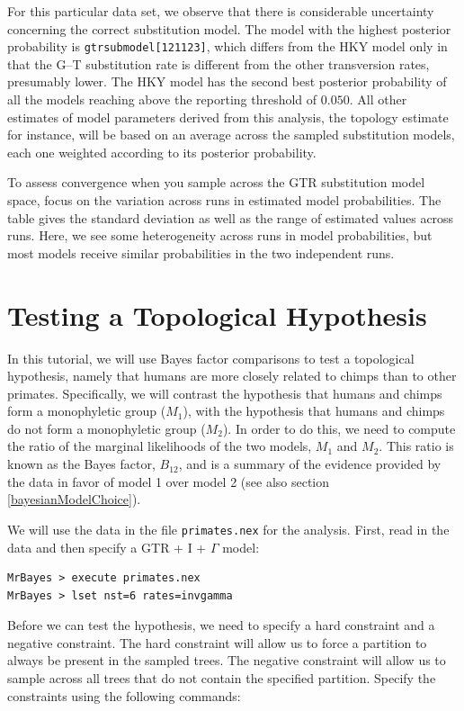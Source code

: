 \documentclass[12pt]{book}
\begin{document}
For this particular data set, we observe that there is considerable uncertainty concerning the
correct substitution model. The model with the highest posterior probability is
\texttt{gtrsubmodel[121123]}, which differs from the HKY model only in that the G--T substitution
rate is different from the other transversion rates, presumably lower. The HKY model has the second
best posterior probability of all the models reaching above the reporting threshold of $0.050$. All
other estimates of model parameters derived from this analysis, the topology estimate for instance,
will be based on an average across the sampled substitution models, each one weighted according to
its posterior probability.

To assess convergence when you sample across the GTR substitution model space, focus on the
variation across runs in estimated model probabilities. The table gives the standard deviation as
well as the range of estimated values across runs. Here, we see some heterogeneity across runs in
model probabilities, but most models receive similar probabilities in the two independent runs.

\section{Testing a Topological Hypothesis}

In this tutorial, we will use Bayes factor comparisons to test a topological hypothesis, namely
that humans are more closely related to chimps than to other primates. Specifically, we will
contrast the hypothesis that humans and chimps form a monophyletic group ($M_{1}$), with the
hypothesis that humans and chimps do not form a monophyletic group ($M_{2}$). In order to do this,
we need to compute the ratio of the marginal likelihoods of the two models, $M_{1}$ and $M_{2}$.
This ratio is known as the Bayes factor, $B_{12}$, and is a summary of the evidence provided by the
data in favor of model 1 over model 2 \citep{kass95} (see also section \ref{bayesianModelChoice}).

We will use the data in the file \texttt{primates.nex} for the analysis. First, read in the data 
and then specify a GTR + I + $\Gamma$ model: %

\begin{Verbatim}
MrBayes > execute primates.nex
MrBayes > lset nst=6 rates=invgamma
\end{Verbatim}

Before we can test the hypothesis, we need to specify a hard constraint and a negative constraint.
The hard constraint will allow us to force a partition to always be present in the sampled trees.
The negative constraint will allow us to sample across all trees that do not contain the specified
partition. Specify the constraints using the following commands:
\end{document}
